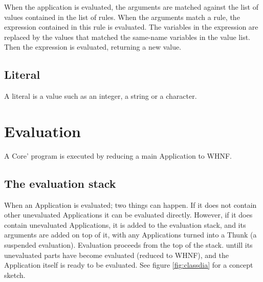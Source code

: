 When the application is evaluated, the arguments are matched against the list of 
values contained in the list of rules. 
When the arguments match a rule, the expression contained in this rule is evaluated. 
The variables in the expression are replaced by the values that matched the same-name
variables in the value list. Then the expression is evaluated, returning a new value.

\subsection{Literal}
A literal is a value such as an integer, a string or a character.


\section{Evaluation}

A Core' program is executed by reducing a main Application to WHNF.

\subsection{The evaluation stack}

When an Application is evaluated; two things can happen. If it does not contain
other unevaluated Applications it can be evaluated directly. However, if it does
contain unevaluated Applications, it is added to the evaluation stack, and its 
arguments are added on top of it, with any Applications turned into a Thunk 
(a suspended evaluation). Evaluation proceeds from the top of the stack.
untill its unevaluated parts have become evaluated (reduced to WHNF), and the
Application itself is ready to be evaluated.
See figure \ref{fig:classdia} for a concept sketch.






